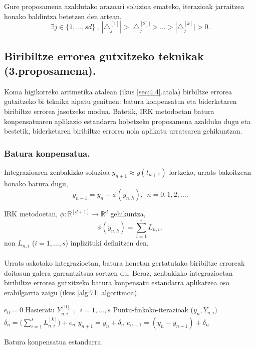 Gure proposamena azaldutako arazoari soluzioa emateko, iterazioak jarraitzea honako baldintza betetzen den artean,
\begin{equation}
\exists j \in \{1,\dots,sd\} \ , \ |\triangle_j^{[1]}| >|\triangle_j^{[2]|}>\dots>|\triangle_j^{[k]}|>0.
\end{equation}


\subsection{Biribiltze errorea gutxitzeko teknikak (3.proposamena).}

Koma higikorreko aritmetika atalean (ikus \ref{sec:4.4}.atala) birbiltze errorea gutxitzeko bi teknika aipatu genituen: batura konpensatua eta biderketaren biribiltze errorea jasotzeko modua. Batetik, IRK metodoetan batura konpensatuaren aplikazio estandarra hobetzeko proposamena azalduko dugu eta bestetik, biderketaren biribiltze errorea nola aplikatu urratsaren gehikuntzan.   

\subsubsection*{Batura konpensatua.}
Integrazioaren zenbakizko soluzioa  $y_{n+1} \approx y(t_{n+1})$  lortzeko, urrats bakoitzean honako batura dugu,
\begin{equation*}
y_{n+1}=y_{n} + \phi(y_{n,h}), \ \ n=0,1,2,\dots.
\end{equation*}   

IRK metodoetan, $\phi: \mathbb{R}^{[d+1]} \rightarrow \mathbb{R}^d$ gehikuntza,
\begin{equation*}
\phi(y_{n,h})=\sum\limits_{i=1}^{s} L_{n,i},
\end{equation*}
non $L_{n,i}$ ($i=1,\dots,s$) inplizituki definitzen den.

\paragraph*{}Urrats askotako integrazioetan, batura honetan gertatutako biribiltze erroreak doitasun galera garrantzitsua sortzen du. Beraz, zenbakizko integrazioetan biribiltze errorea gutxitzeko  batura konpensatu estandarra aplikatzea oso erabilgarria zaigu (ikus \ref{alg:71} algoritmoa).

\begin{algorithm}[h]
 \BlankLine
  ${e}_{0}=0$\;
  \BlankLine
  {
   Hasieratu  $Y_{n,i}^{[0]} \ \ , \ \ i=1,\dots,s $\;
   Puntu-finkoko-iterazioak ($y_n, Y_{n,i})$ \;
   \BlankLine
    ${\delta}_{n}= \big(\sum\limits_{i=1}^{s} L_{n,i}^{[k]}\big) +  {e}_{n} $\;
    ${y}_{n+1}={y}_{n} + {\delta}_n$\;
    ${e}_{n+1}=({y}_{n} - {y}_{n+1})+ {\delta}_n$\;            
   \BlankLine
 }
 \caption{Batura konpensatua estandarra.}
 \label{alg:71}
\end{algorithm}

